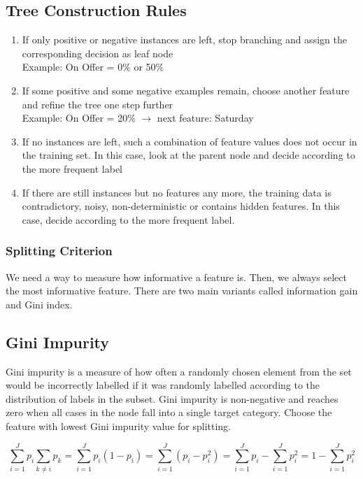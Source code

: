 \documentclass[11pt]{article}
\begin{document}
\subsection{Tree Construction Rules}

\begin{enumerate}
    \item If only positive or negative instances are left, stop branching and assign the corresponding decision as leaf node\\Example: On Offer = 0\% or 50\%
    \item If some positive and some negative examples remain, choose another feature and refine the tree one step further\\Example: On Offer = 20\% $\rightarrow$ next feature: Saturday
    \item If no instances are left, such a combination of feature values does not occur in the training set. In this case, look at the parent node and decide according to the more frequent label
    \item If there are still instances but no features any more, the training data is contradictory, noisy, non-deterministic or contains hidden features. In this case, decide according to the more frequent label.
\end{enumerate}

\subsubsection{Splitting Criterion}
We need a way to measure how informative a feature is. Then, we always select the most informative feature. There are two main variants called information gain and Gini index.

\subsection{Gini Impurity}
Gini impurity is a measure of how often a randomly chosen element from the set would be incorrectly labelled if it was randomly labelled according to the distribution of labels in the subset. Gini impurity is non-negative and reaches zero when all cases in the node fall into a single target category. Choose the feature with lowest Gini impurity value for splitting.

\begin{equation}
    \sum_{i=1}^{J}p_i \sum_{k\neq i} p_k = \sum_{i=1}^{J}p_i(1-p_i) = \sum_{i=1}^{J}(p_i - p_i^2) = \sum_{i=1}^{J}p_i - \sum_{i=1}^{J}p_i^2 = 1 -\sum_{i=1}^{J}p_i^2
\end{equation}
\end{document}
